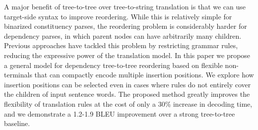 A major benefit of tree-to-tree over tree-to-string translation is that we can use target-side syntax to improve reordering. While this is relatively simple for binarized constituency parses, the reordering problem is considerably harder for dependency parses, in which parent nodes can have arbitrarily many children. Previous approaches have tackled this problem by restricting grammar rules, reducing the expressive power of the translation model. In this paper we propose a general model for dependency tree-to-tree reordering based on flexible non-terminals that can compactly encode multiple insertion positions. We explore how insertion positions can be selected even in cases where rules do not entirely cover the children of input sentence words. The proposed method greatly improves the flexibility of translation rules at the cost of only a 30\% increase in decoding time, and we demonstrate a 1.2-1.9 BLEU improvement over a strong tree-to-tree baseline.
